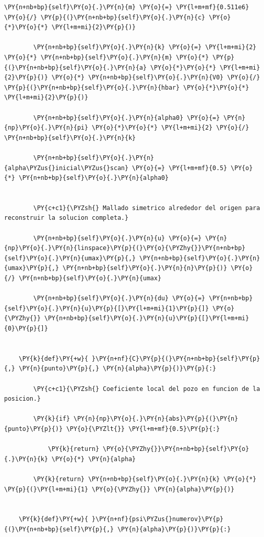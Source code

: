 \documentclass[11pt]{article}
\makeatletter
\def\PY@reset{\let\PY@it=\relax \let\PY@bf=\relax \let\PY@ul=\relax \let\PY@tc=\relax \let\PY@bc=\relax \let\PY@ff=\relax}
\def\PY@tok#1{\csname PY@tok@#1\endcsname}
\def\PY@toks#1+{\ifx\relax#1\empty\else \PY@tok{#1}\expandafter\PY@toks\fi}
\def\PY@do#1{\PY@bc{\PY@tc{\PY@ul{\PY@it{\PY@bf{\PY@ff{#1}}}}}}}
\def\PY#1#2{\PY@reset\PY@toks#1+\relax+\PY@do{#2}}
\makeatother
\begin{document}
\begin{tcolorbox}[breakable, size=fbox, boxrule=1pt, pad at break*=1mm,colback=cellbackground, colframe=cellborder]
\begin{Verbatim}[commandchars=\\\{\}]
        \PY{n+nb+bp}{self}\PY{o}{.}\PY{n}{m} \PY{o}{=} \PY{l+m+mf}{0.511e6} \PY{o}{/} \PY{p}{(}\PY{n+nb+bp}{self}\PY{o}{.}\PY{n}{c} \PY{o}{*}\PY{o}{*} \PY{l+m+mi}{2}\PY{p}{)}

        \PY{n+nb+bp}{self}\PY{o}{.}\PY{n}{k} \PY{o}{=} \PY{l+m+mi}{2} \PY{o}{*} \PY{n+nb+bp}{self}\PY{o}{.}\PY{n}{m} \PY{o}{*} \PY{p}{(}\PY{n+nb+bp}{self}\PY{o}{.}\PY{n}{a} \PY{o}{*}\PY{o}{*} \PY{l+m+mi}{2}\PY{p}{)} \PY{o}{*} \PY{n+nb+bp}{self}\PY{o}{.}\PY{n}{V0} \PY{o}{/} \PY{p}{(}\PY{n+nb+bp}{self}\PY{o}{.}\PY{n}{hbar} \PY{o}{*}\PY{o}{*} \PY{l+m+mi}{2}\PY{p}{)}

        \PY{n+nb+bp}{self}\PY{o}{.}\PY{n}{alpha0} \PY{o}{=} \PY{n}{np}\PY{o}{.}\PY{n}{pi} \PY{o}{*}\PY{o}{*} \PY{l+m+mi}{2} \PY{o}{/} \PY{n+nb+bp}{self}\PY{o}{.}\PY{n}{k}

        \PY{n+nb+bp}{self}\PY{o}{.}\PY{n}{alpha\PYZus{}inicial\PYZus{}scan} \PY{o}{=} \PY{l+m+mf}{0.5} \PY{o}{*} \PY{n+nb+bp}{self}\PY{o}{.}\PY{n}{alpha0}


        \PY{c+c1}{\PYZsh{} Mallado simetrico alrededor del origen para reconstruir la solucion completa.}

        \PY{n+nb+bp}{self}\PY{o}{.}\PY{n}{u} \PY{o}{=} \PY{n}{np}\PY{o}{.}\PY{n}{linspace}\PY{p}{(}\PY{o}{\PYZhy{}}\PY{n+nb+bp}{self}\PY{o}{.}\PY{n}{umax}\PY{p}{,} \PY{n+nb+bp}{self}\PY{o}{.}\PY{n}{umax}\PY{p}{,} \PY{n+nb+bp}{self}\PY{o}{.}\PY{n}{n}\PY{p}{)} \PY{o}{/} \PY{n+nb+bp}{self}\PY{o}{.}\PY{n}{umax}

        \PY{n+nb+bp}{self}\PY{o}{.}\PY{n}{du} \PY{o}{=} \PY{n+nb+bp}{self}\PY{o}{.}\PY{n}{u}\PY{p}{[}\PY{l+m+mi}{1}\PY{p}{]} \PY{o}{\PYZhy{}} \PY{n+nb+bp}{self}\PY{o}{.}\PY{n}{u}\PY{p}{[}\PY{l+m+mi}{0}\PY{p}{]}


    \PY{k}{def}\PY{+w}{ }\PY{n+nf}{C}\PY{p}{(}\PY{n+nb+bp}{self}\PY{p}{,} \PY{n}{punto}\PY{p}{,} \PY{n}{alpha}\PY{p}{)}\PY{p}{:}

        \PY{c+c1}{\PYZsh{} Coeficiente local del pozo en funcion de la posicion.}

        \PY{k}{if} \PY{n}{np}\PY{o}{.}\PY{n}{abs}\PY{p}{(}\PY{n}{punto}\PY{p}{)} \PY{o}{\PYZlt{}} \PY{l+m+mf}{0.5}\PY{p}{:}

            \PY{k}{return} \PY{o}{\PYZhy{}}\PY{n+nb+bp}{self}\PY{o}{.}\PY{n}{k} \PY{o}{*} \PY{n}{alpha}

        \PY{k}{return} \PY{n+nb+bp}{self}\PY{o}{.}\PY{n}{k} \PY{o}{*} \PY{p}{(}\PY{l+m+mi}{1} \PY{o}{\PYZhy{}} \PY{n}{alpha}\PY{p}{)}


    \PY{k}{def}\PY{+w}{ }\PY{n+nf}{psi\PYZus{}numerov}\PY{p}{(}\PY{n+nb+bp}{self}\PY{p}{,} \PY{n}{alpha}\PY{p}{)}\PY{p}{:}


\end{Verbatim}
\end{tcolorbox}
\end{document}
